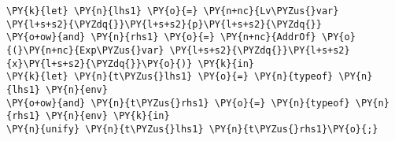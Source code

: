 \begin{Verbatim}[commandchars=\\\{\}]
\PY{k}{let} \PY{n}{lhs1} \PY{o}{=} \PY{n+nc}{Lv\PYZus{}var} \PY{l+s+s2}{\PYZdq{}}\PY{l+s+s2}{p}\PY{l+s+s2}{\PYZdq{}}
\PY{o+ow}{and} \PY{n}{rhs1} \PY{o}{=} \PY{n+nc}{AddrOf} \PY{o}{(}\PY{n+nc}{Exp\PYZus{}var} \PY{l+s+s2}{\PYZdq{}}\PY{l+s+s2}{x}\PY{l+s+s2}{\PYZdq{}}\PY{o}{)} \PY{k}{in}
\PY{k}{let} \PY{n}{t\PYZus{}lhs1} \PY{o}{=} \PY{n}{typeof} \PY{n}{lhs1} \PY{n}{env}
\PY{o+ow}{and} \PY{n}{t\PYZus{}rhs1} \PY{o}{=} \PY{n}{typeof} \PY{n}{rhs1} \PY{n}{env} \PY{k}{in}
\PY{n}{unify} \PY{n}{t\PYZus{}lhs1} \PY{n}{t\PYZus{}rhs1}\PY{o}{;}
\end{Verbatim}

